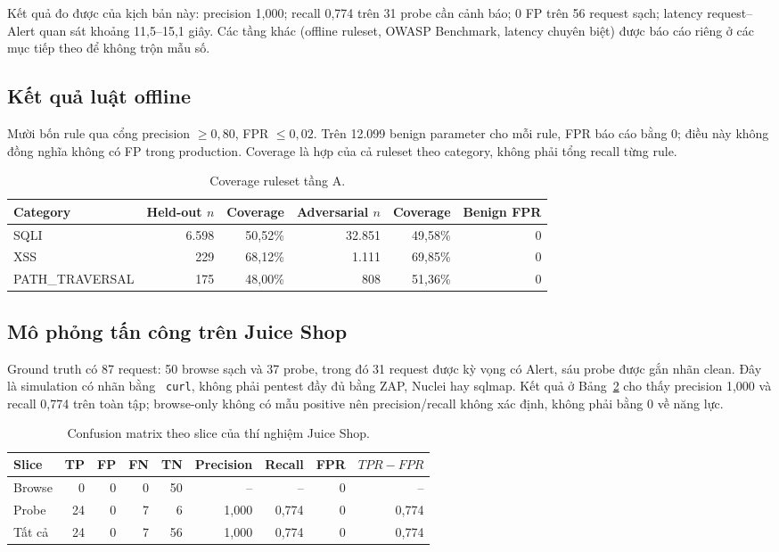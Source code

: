 \documentclass[runningheads]{report-template/llncs}
\newcommand{\code}[1]{\texttt{\small\hyphenchar\font=45 #1}}
\newcommand{\na}{--}
\begin{document}
Kết quả đo được của kịch bản này: precision 1,000; recall 0,774 trên 31
probe cần cảnh báo; 0 FP trên 56 request sạch; latency request--Alert
quan sát khoảng 11,5--15,1 giây. Các tầng khác (offline ruleset, OWASP
Benchmark, latency chuyên biệt) được báo cáo riêng ở các mục tiếp theo
để không trộn mẫu số.

\subsection{Kết quả luật offline}

Mười bốn rule qua cổng precision \(\geq0{,}80\), FPR \(\leq0{,}02\).
Trên 12.099 benign parameter cho mỗi rule, FPR báo cáo bằng 0; điều này
không đồng nghĩa không có FP trong production. Coverage là hợp của cả
ruleset theo category, không phải tổng recall từng rule.

\begin{table}
\caption{Coverage ruleset tầng A.}
\label{tab:tiera}
\centering\small
\begin{tabular}{@{}lrrrrr@{}}
\toprule
Category & Held-out \(n\) & Coverage & Adversarial \(n\) & Coverage &
Benign FPR\\
\midrule
SQLI & 6.598 & 50,52\% & 32.851 & 49,58\% & 0\\
XSS & 229 & 68,12\% & 1.111 & 69,85\% & 0\\
PATH\_TRAVERSAL & 175 & 48,00\% & 808 & 51,36\% & 0\\
\bottomrule
\end{tabular}
\end{table}

\subsection{Mô phỏng tấn công trên Juice Shop}

Ground truth có 87 request: 50 browse sạch và 37 probe, trong đó 31
request được kỳ vọng có Alert, sáu probe được gắn nhãn clean. Đây là
simulation có nhãn bằng \code{curl}, không phải pentest đầy đủ bằng ZAP,
Nuclei hay sqlmap. Kết quả ở Bảng~\ref{tab:juice} cho thấy precision
1,000 và recall 0,774 trên toàn tập; browse-only không có mẫu positive
nên precision/recall không xác định, không phải bằng 0 về năng lực.

\begin{table}
\caption{Confusion matrix theo slice của thí nghiệm Juice Shop.}
\label{tab:juice}
\centering\small
\begin{tabular}{@{}lrrrrrrrr@{}}
\toprule
Slice & TP & FP & FN & TN & Precision & Recall & FPR & \(TPR-FPR\)\\
\midrule
Browse & 0 & 0 & 0 & 50 & \na & \na & 0 & \na\\
Probe & 24 & 0 & 7 & 6 & 1,000 & 0,774 & 0 & 0,774\\
Tất cả & 24 & 0 & 7 & 56 & 1,000 & 0,774 & 0 & 0,774\\
\bottomrule
\end{tabular}
\end{table}
\end{document}
